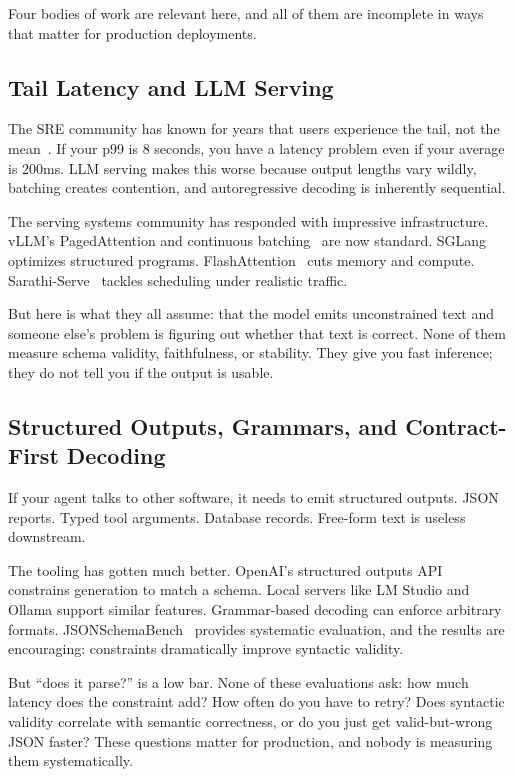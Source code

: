 \documentclass[11pt]{article}
\begin{document}
Four bodies of work are relevant here, and all of them are incomplete in ways that matter for production deployments.

\subsection{Tail Latency and LLM Serving}

The SRE community has known for years that users experience the tail, not the mean~\citep{dean2013tail}.
If your p99 is 8 seconds, you have a latency problem even if your average is 200ms.
LLM serving makes this worse because output lengths vary wildly, batching creates contention, and autoregressive decoding is inherently sequential.

The serving systems community has responded with impressive infrastructure.
vLLM's PagedAttention and continuous batching~\citep{kwon2023vllm} are now standard.
SGLang~\citep{zheng2023sglang} optimizes structured programs.
FlashAttention~\citep{dao2023flashattention2} cuts memory and compute.
Sarathi-Serve~\citep{agrawal2024sarathi} tackles scheduling under realistic traffic.

But here is what they all assume: that the model emits unconstrained text and someone else's problem is figuring out whether that text is correct.
None of them measure schema validity, faithfulness, or stability.
They give you fast inference; they do not tell you if the output is usable.

\subsection{Structured Outputs, Grammars, and Contract-First Decoding}

If your agent talks to other software, it needs to emit structured outputs.
JSON reports.
Typed tool arguments.
Database records.
Free-form text is useless downstream.

The tooling has gotten much better.
OpenAI's structured outputs API~\citep{openaiStructuredOutputs} constrains generation to match a schema.
Local servers like LM Studio and Ollama support similar features.
Grammar-based decoding can enforce arbitrary formats.
JSONSchemaBench~\citep{geng2025jsonschemabench} provides systematic evaluation, and the results are encouraging: constraints dramatically improve syntactic validity.

But ``does it parse?'' is a low bar.
None of these evaluations ask: how much latency does the constraint add?
How often do you have to retry?
Does syntactic validity correlate with semantic correctness, or do you just get valid-but-wrong JSON faster?
These questions matter for production, and nobody is measuring them systematically.
\end{document}
